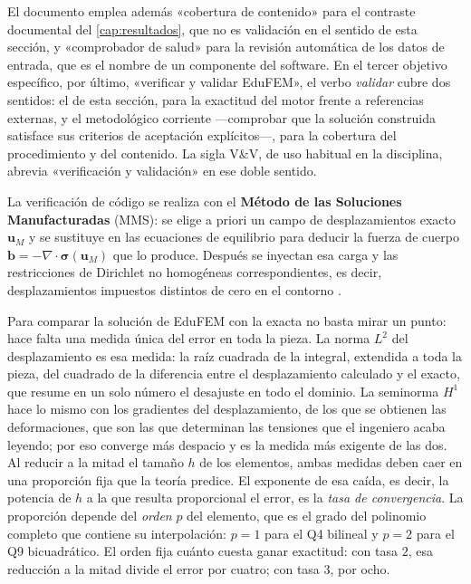 El documento emplea además «cobertura de contenido» para el contraste documental del \autoref{cap:resultados}, que no es validación en el sentido de esta sección, y «comprobador de salud» para la revisión automática de los datos de entrada, que es el nombre de un componente del software. En el tercer objetivo específico, por último, «verificar y validar EduFEM», el verbo \emph{validar} cubre dos sentidos: el de esta sección, para la exactitud del motor frente a referencias externas, y el metodológico corriente ---comprobar que la solución construida satisface sus criterios de aceptación explícitos---, para la cobertura del procedimiento y del contenido. La sigla V\&V, de uso habitual en la disciplina, abrevia «verificación y validación» en ese doble sentido.

La verificación de código se realiza con el \textbf{Método de las Soluciones Manufacturadas} (MMS): se elige a priori un campo de desplazamientos exacto $\bm{u}_M$ y se sustituye en las ecuaciones de equilibrio para deducir la fuerza de cuerpo $\bm{b} = -\nabla\cdot\bm{\sigma}(\bm{u}_M)$ que lo produce. Después se inyectan esa carga y las restricciones de Dirichlet no homogéneas correspondientes, es decir, desplazamientos impuestos distintos de cero en el contorno \autocites[pp.~21, 26]{salari2000mms}[pp.~219-222]{oberkampf2010vv}.

Para comparar la solución de EduFEM con la exacta no basta mirar un punto: hace falta una medida única del error en toda la pieza. La norma $L^2$ del desplazamiento es esa medida: la raíz cuadrada de la integral, extendida a toda la pieza, del cuadrado de la diferencia entre el desplazamiento calculado y el exacto, que resume en un solo número el desajuste en todo el dominio. La seminorma $H^1$ hace lo mismo con los gradientes del desplazamiento, de los que se obtienen las deformaciones, que son las que determinan las tensiones que el ingeniero acaba leyendo; por eso converge más despacio y es la medida más exigente de las dos. Al reducir a la mitad el tamaño $h$ de los elementos, ambas medidas deben caer en una proporción fija que la teoría predice. El exponente de esa caída, es decir, la potencia de $h$ a la que resulta proporcional el error, es la \emph{tasa de convergencia}. La proporción depende del \emph{orden} $p$ del elemento, que es el grado del polinomio completo que contiene su interpolación: $p = 1$ para el Q4 bilineal y $p = 2$ para el Q9 bicuadrático. El orden fija cuánto cuesta ganar exactitud: con tasa $2$, esa reducción a la mitad divide el error por cuatro; con tasa $3$, por ocho.

